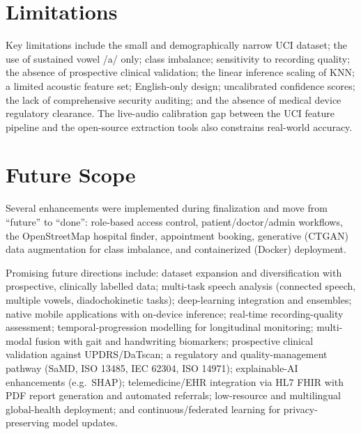 \documentclass[oneside,a4paper,12pt]{report}
\begin{document}
\section{Limitations}
Key limitations include the small and demographically narrow UCI dataset; the use
of sustained vowel /a/ only; class imbalance; sensitivity to recording quality;
the absence of prospective clinical validation; the linear inference scaling of
KNN; a limited acoustic feature set; English-only design; uncalibrated confidence
scores; the lack of comprehensive security auditing; and the absence of medical
device regulatory clearance. The live-audio calibration gap between the UCI
feature pipeline and the open-source extraction tools also constrains real-world
accuracy.

\section{Future Scope}
Several enhancements were implemented during finalization and move from
``future'' to ``done'': role-based access control, patient/doctor/admin
workflows, the OpenStreetMap hospital finder, appointment booking, generative
(CTGAN) data augmentation for class imbalance, and containerized (Docker)
deployment.

Promising future directions include: dataset expansion and diversification with
prospective, clinically labelled data; multi-task speech analysis (connected
speech, multiple vowels, diadochokinetic tasks); deep-learning integration and
ensembles; native mobile applications with on-device inference; real-time
recording-quality assessment; temporal-progression modelling for longitudinal
monitoring; multi-modal fusion with gait and handwriting biomarkers; prospective
clinical validation against UPDRS/DaTscan; a regulatory and quality-management
pathway (SaMD, ISO 13485, IEC 62304, ISO 14971); explainable-AI enhancements
(e.g.\ SHAP); telemedicine/EHR integration via HL7 FHIR with PDF report
generation and automated referrals; low-resource and multilingual global-health
deployment; and continuous/federated learning for privacy-preserving model
updates.
\end{document}
